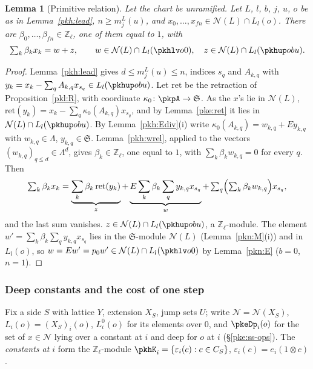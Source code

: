 \documentclass[10pt]{amsart}
\newtheorem{lemma}[theorem]{Lemma}
\theoremstyle{definition}
\theoremstyle{remark}
\newcommand{\Z}{\mathbb Z}
\begin{document}
\begin{lemma}[Primitive relation]\label{pkh:prim}
Let the chart be unramified. Let $L$, $l$, $b$, $j$, $u$, $o$ be as in Lemma~\ref{pkh:lead}, $n\ge m^L_j(u)$,
and $x_0,\dots,x_{fn}\in\mathcal N(L)\cap L_l(o)$. There are $\beta_0,\dots,\beta_{fn}\in\Z_\ell$, one of them
equal to $1$, with
\[
\textstyle\sum_k\beta_kx_k=w+z,\qquad w\in\mathcal N(L)\cap L_l(\pkhlv o0),\quad z\in\mathcal N(L)\cap
L_l(\pkhup obu).
\]
\end{lemma}

\begin{proof}
Lemma~\ref{pkh:lead} gives $d\le m^L_j(u)\le n$, indices $s_q$ and $A_{k,q}$ with $y_k=x_k-\sum_qA_{k,q}x_{s_q}\in
L_l(\pkhup obu)$. Let $\mathrm{ret}$ be the retraction of Proposition~\ref{pkl:R}, with coordinate $\kappa_0\colon
\pkpA\to\mathfrak S$. As the $x$'s lie in $\mathcal N(L)$, $\mathrm{ret}(y_k)=x_k-\sum_q\kappa_0(A_{k,q})x_{s_q}$, and
by Lemma~\ref{pke:ret} it lies in $\mathcal N(L)\cap L_l(\pkhup obu)$. By Lemma~\ref{pkh:Ediv}(i) write
$\kappa_0(A_{k,q})=w_{k,q}+Ey_{k,q}$ with $w_{k,q}\in\Lambda$, $y_{k,q}\in\mathfrak S$. Lemma~\ref{pkh:wrel},
applied to the vectors $(w_{k,q})_{q\le d}\in\Lambda^d$, gives $\beta_k\in\Z_\ell$, one equal to $1$, with
$\sum_k\beta_kw_{k,q}=0$ for every $q$. Then
\[
\textstyle\sum_k\beta_kx_k=\underbrace{\sum_k\beta_k\,\mathrm{ret}(y_k)}_{z}+\underbrace{E\sum_k\beta_k\sum_q
y_{k,q}x_{s_q}}_{w}+\sum_q\Bigl(\sum_k\beta_kw_{k,q}\Bigr)x_{s_q},
\]
and the last sum vanishes. $z\in\mathcal N(L)\cap L_l(\pkhup obu)$, a $\Z_\ell$-module. The element
$w'=\sum_k\beta_k\sum_qy_{k,q}x_{s_q}$ lies in the $\mathfrak S$-module $\mathcal N(L)$ (Lemma~\ref{pkn:M}(i)) and
in $L_l(o)$, so $w=Ew'=p_0w'\in\mathcal N(L)\cap L_l(\pkhlv o0)$ by Lemma~\ref{pkn:E} ($b=0$, $n=1$).
\end{proof}

\subsubsection{Deep constants and the cost of one step}\label{pkh:ss-step}

Fix a side $S$ with lattice $Y$, extension $X_S$, jump sets $U$; write $\mathcal N=\mathcal N(X_S)$,
$L_i(o)=(X_S)_i(o)$, $L^0_i(o)$ for its elements over $0$, and $\pkeDp_i(o)$ for the set of $x\in\mathcal N$
lying over a constant at $i$ and deep for $o$ at $i$ (\S\ref{pke:ss-ops}). The \emph{constants at $i$} form
the $\Z_\ell$-module $\pkhK_i=\{\varepsilon_i(c):c\in C_S\}$, $\varepsilon_i(c)=e_i(1\otimes c)$.
\end{document}
